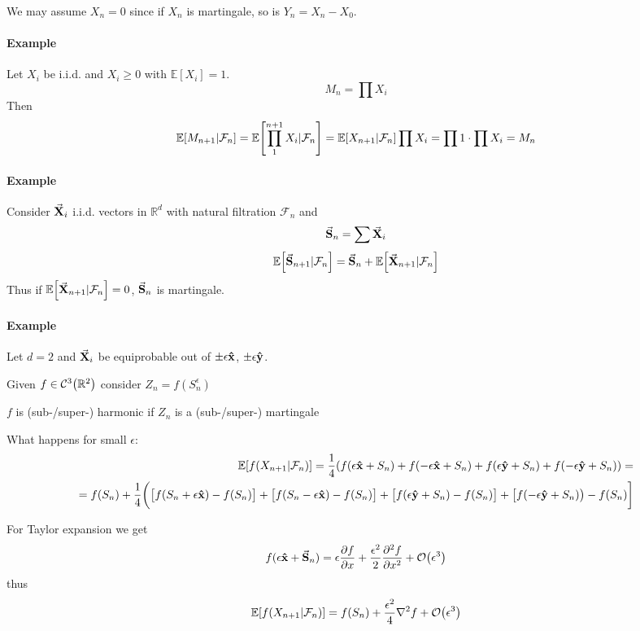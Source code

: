 We may assume $X_n=0$ since if $X_n$ is martingale, so is $Y_n=X_n-X_0$.
\paragraph{Example} 
Let $X_i$ be i.i.d. and $X_i\geq 0$ with $\mathbb{E}[X_i] = 1$. 
$$M_n  = \prod X_i$$
Then
$$\mathbb{E}\qty[M_{n+1}|\mathcal{F}_n] = \mathbb{E} \qty[\prod_{1}^{n+1} X_i| \mathcal{F}_n] = \mathbb{E} \qty[X_{n+1}|\mathcal{F}_n] \prod X_i = \prod 1 \cdot \prod X_i = M_n$$
\paragraph{Example} 
Consider $\va{X}_i$ i.i.d. vectors in $\mathbb{R}^d$ with natural filtration $\mathcal{F}_n$ and
$$\va{S}_n = \sum \va{X}_i$$
$$\mathbb{E} \qty[\va{S}_{n+1} | \mathcal{F}_n] = \va{S}_n + \mathbb{E} \qty[\va{X}_{n+1} | \mathcal{F}_n]$$
Thus if $\mathbb{E} \qty[\va{X}_{n+1} | \mathcal{F}_n] = 0$, $\va{S}_n$ is martingale.

\paragraph{Example}
Let $d=2$ and $\va{X}_i$ be equiprobable out of $\pm \epsilon \vu{x}$, $\pm\epsilon \vu{y}$.

Given $f \in \mathcal{C}^3\qty(\mathbb{R}^2)$ consider $Z_n = f(S_n^\epsilon)$

\begin{definition}
	$f$ is (sub-/super-) harmonic if $Z_n$ is a (sub-/super-) martingale
\end{definition}

What happens for small $\epsilon$:
\begin{align*}
\mathbb{E} \qty[f(X_{n+1} | \mathcal{F}_n)] = \frac{1}{4} \qty(f(\epsilon \vu{x} + S_n)+f(-\epsilon \vu{x} + S_n)+f(\epsilon \vu{y} + S_n)+f(-\epsilon \vu{y} + S_n))  =\\= f(S_n) + \frac{1}{4}\qty\bigg(\qty\big[f( S_n+\epsilon \vu{x})-f(S_n)]+\qty\big[f(S_n-\epsilon \vu{x})-f(S_n)]+\qty\big[f(\epsilon \vu{y} + S_n)-f(S_n)]+\qty\big[f(-\epsilon \vu{y} + S_n)) -f(S_n)] 
\end{align*}

For Taylor expansion we get
$$f(\epsilon \vu{x}+ \va{S}_n) = \epsilon \pdv{f}{x} + \frac{\epsilon^2}{2} \pdv[2]{f}{x} + \order{\epsilon^3}$$
thus\begin{align*}
\mathbb{E} \qty[f(X_{n+1} | \mathcal{F}_n)] = f(S_n) + \frac{\epsilon^2}{4} \laplacian{f} + \order{\epsilon^3} 
\end{align*}

